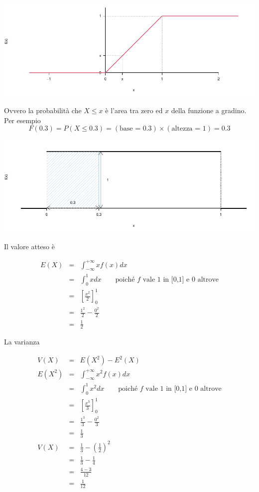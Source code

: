 \documentclass[
  11pt,
]{book}
\theoremstyle{mytheoremstyle}
\theoremstyle{mydefstyle}
\begin{document}
\begin{center}\includegraphics{Appunti_di_Statistica_2025_files/figure-latex/06-unif2-1} \end{center}

Ovvero la probabilità che \(X\leq x\) è l'area tra zero ed \(x\) della funzione a gradino.
Per esempio
\[
F(0.3)=P(X\leq 0.3) =(\text{base = 0.3})\times(\text{altezza = 1})=0.3
\]

\begin{center}\includegraphics{Appunti_di_Statistica_2025_files/figure-latex/06-unif3-1} \end{center}

Il valore atteso è

\begin{eqnarray*}
E(X) &=& \int_{-\infty}^{+\infty} xf(x)dx\\
&=& \int_{0}^{1} xdx\qquad\text{poiché $f$ vale 1 in [0,1] e 0 altrove}\\
&=& \left[\frac{x^2}2 \right]_0^1\\
&=& \frac {1^2}2 - \frac {0^2}2 \\
&=& \frac 12
\end{eqnarray*}

La varianza

\begin{eqnarray*}
V(X) &=& E(X^2)-E^2(X)\\
E(X^2) &=& \int_{-\infty}^{+\infty} x^2f(x)dx\\
  &=& \int_{0}^{1} x^2dx\qquad\text{poiché $f$ vale 1 in [0,1] e 0 altrove}\\
  &=& \left[\frac{x^3}3 \right]_0^1\\
  &=& \frac {1^3}3 - \frac {0^2}3 \\
  &=& \frac 13 \\
V(X) &=& \frac 13-\left(\frac 12\right)^2\\
  &=&  \frac 13-\frac 14\\
  &=& \frac{4-3}{12}\\
  &=& \frac 1{12}
\end{eqnarray*}
\end{document}
